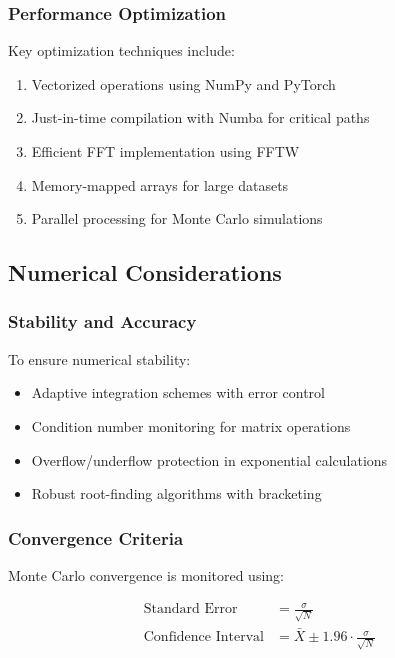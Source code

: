 \documentclass[12pt,a4paper]{article}
\begin{document}
\subsubsection{Performance Optimization}

Key optimization techniques include:

\begin{enumerate}
    \item Vectorized operations using NumPy and PyTorch
    \item Just-in-time compilation with Numba for critical paths
    \item Efficient FFT implementation using FFTW
    \item Memory-mapped arrays for large datasets
    \item Parallel processing for Monte Carlo simulations
\end{enumerate}

\subsection{Numerical Considerations}

\subsubsection{Stability and Accuracy}

To ensure numerical stability:

\begin{itemize}
    \item Adaptive integration schemes with error control
    \item Condition number monitoring for matrix operations
    \item Overflow/underflow protection in exponential calculations
    \item Robust root-finding algorithms with bracketing
\end{itemize}

\subsubsection{Convergence Criteria}

Monte Carlo convergence is monitored using:

\begin{align}
\text{Standard Error} &= \frac{\sigma}{\sqrt{N}} \\
\text{Confidence Interval} &= \bar{X} \pm 1.96 \cdot \frac{\sigma}{\sqrt{N}}
\end{align}
\end{document}
